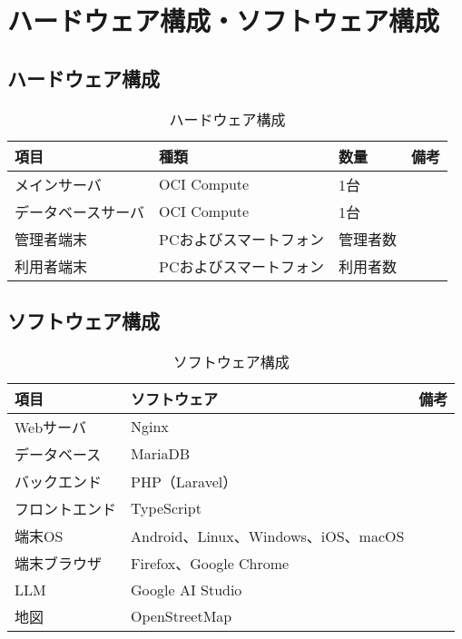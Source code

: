 \documentclass{docs}
\begin{document}
\section{ハードウェア構成・ソフトウェア構成}
\subsection{ハードウェア構成}
\begin{table}[H]
    \centering
    \caption{ハードウェア構成}
    \label{tab:hardware}
    \begin{tabularx}{0.9\textwidth}{|l|X|X|X|}
        \hline
        \textbf{項目} & \textbf{種類} & \textbf{数量} & \textbf{備考} \\ \hline
        メインサーバ & OCI Compute & 1台 & \\ \hline
        データベースサーバ & OCI Compute & 1台 & \\ \hline
        管理者端末 & PCおよびスマートフォン & 管理者数 & \\ \hline
        利用者端末 & PCおよびスマートフォン & 利用者数 & \\ \hline
    \end{tabularx}
\end{table}

\subsection{ソフトウェア構成}
\begin{table}[H]
    \centering
    \caption{ソフトウェア構成}
    \label{tab:software}
    \begin{tabularx}{0.9\textwidth}{|l|X|X|}
        \hline
        \textbf{項目} & \textbf{ソフトウェア} & \textbf{備考} \\ \hline
        Webサーバ & Nginx & \\ \hline
        データベース & MariaDB & \\ \hline
        バックエンド & PHP（Laravel） & \\ \hline
        フロントエンド & TypeScript & \\ \hline
        端末OS & Android、Linux、Windows、iOS、macOS & \\ \hline
        端末ブラウザ & Firefox、Google Chrome & \\ \hline
        LLM & Google AI Studio & \\ \hline
        地図 & OpenStreetMap & \\ \hline
    \end{tabularx}
\end{table}
\end{document}
